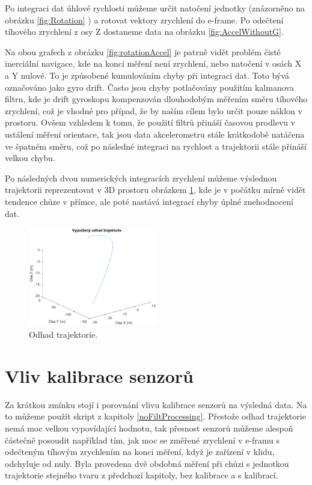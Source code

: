 Po integraci dat úhlové rychlosti můžeme určit natočení jednotky (znázorněno na obrázku \ref{fig:Rotation} ) a rotovat vektory zrychlení do e-frame. Po odečtení tíhového zrychlení z osy Z dostaneme data na obrázku \ref{fig:AccelWithoutG}.

Na obou grafech z obrázku \ref{fig:rotationAccel} je patrně vidět problém čistě inerciální navigace, kde na konci měření není zrychlení, nebo natočení v osách X a Y nulové. To je způsobené kumulováním chyby při integraci dat. Toto bývá označováno jako gyro drift. Často jsou chyby potlačovány použitím kalmanova filtru, kde je drift gyroskopu kompenzován dlouhodobým měřením směru tíhového zrychlení, což je vhodné pro případ, že by naším cílem bylo určit pouze náklon v prostoru. Ovšem vzhledem k tomu, že použití filtrů přináší časovou prodlevu v ustálení měření orientace, tak jsou data akcelerometru stále krátkodobě natáčena ve špatném směru, což po následné integraci na rychlost a trajektorii stále přináší velkou chybu.

Po následných dvou numerických integracích zrychlení můžeme výslednou trajektorii reprezentovat v 3D prostoru obrázkem \ref{fig:Trajectory}, kde je v počátku mírně vidět tendence chůze v přímce, ale poté nastává integrací chyby úplné znehodnocení dat. 

\begin{figure}[h]
     \centering
         \includegraphics[width=0.5\textwidth]{obrazky/matlab/1measTraj}
         \caption{Odhad trajektorie.}
        \label{fig:Trajectory}
\end{figure}

\section{Vliv kalibrace senzorů}
Za krátkou zmínku stojí i porovnání vlivu kalibrace senzorů na výsledná data. Na to můžeme použít skript z kapitoly \ref{noFiltProcessing}. Přestože odhad trajektorie nemá moc velkou vypovídající hodnotu, tak přesnost senzorů můžeme alespoň částečně posoudit například tím, jak moc se změřené zrychlení v e-framu s odečteným tíhovým zrychlením na konci měření, když je zařízení v klidu, odchyluje od nuly. Byla provedena dvě obdobná měření při chůzi s jednotkou trajektorie stejného tvaru z předchozí kapitoly, bez kalibrace a s kalibrací.

